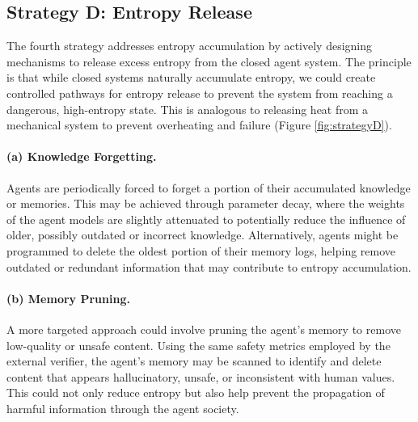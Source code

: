 \documentclass{article}
\theoremstyle{definition}
\theoremstyle{plain}
\begin{document}
\subsection{Strategy D: Entropy Release}
The fourth strategy addresses entropy accumulation by actively designing mechanisms to release excess entropy from the closed agent system. The principle is that while closed systems naturally accumulate entropy, we could create controlled pathways for entropy release to prevent the system from reaching a dangerous, high-entropy state. This is analogous to releasing heat from a mechanical system to prevent overheating and failure (Figure \ref{fig:strategyD}).
\paragraph{\textbf{(a) Knowledge Forgetting.}} %
Agents are periodically forced to forget a portion of their accumulated knowledge or memories. This may be achieved through parameter decay, where the weights of the agent models are slightly attenuated to potentially reduce the influence of older, possibly outdated or incorrect knowledge. Alternatively, agents might be programmed to delete the oldest portion of their memory logs, helping remove outdated or redundant information that may contribute to entropy accumulation. 
\paragraph{\textbf{(b) Memory Pruning.}} %
A more targeted approach could involve pruning the agent’s memory to remove low-quality or unsafe content. Using the same safety metrics employed by the external verifier, the agent’s memory may be scanned to identify and delete content that appears hallucinatory, unsafe, or inconsistent with human values. This could not only reduce entropy but also help prevent the propagation of harmful information through the agent society. 
\end{document}
